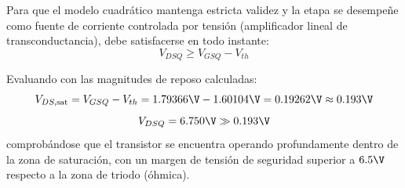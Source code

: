 Para que el modelo cuadrático mantenga estricta validez y la etapa se desempeñe como fuente de corriente controlada por
tensión (amplificador lineal de transconductancia), debe satisfacerse en todo instante:
\begin{equation}
  V_{DSQ} \ge V_{GSQ} - V_{th}
\end{equation}

Evaluando con las magnitudes de reposo calculadas:
\begin{equation}
  V_{DS,\mathrm{sat}} = V_{GSQ} - V_{th} = 1.79366\V - 1.60104\V = 0.19262\V \approx 0.193\V
\end{equation}
\begin{equation}
  V_{DSQ} = 6.750\V \gg 0.193\V
\end{equation}
comprobándose que el transistor se encuentra operando profundamente dentro de la zona de saturación, con un margen de
tensión de seguridad superior a $6.5\V$ respecto a la zona de triodo (óhmica).

